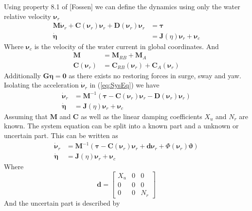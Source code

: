 \documentclass[12pt,a4]{article}
\begin{document}
Using property 8.1 of [Fossen] we can define the dynamics using only the water relative velocity $\bm{\nu}_r$
\begin{align}
	\label{eq:SysEq} \bm{M}\bm{\dot{\nu}}_r + \bm{C}(\bm{\nu}_r)\bm{\nu}_r +\bm{D}(\bm{\nu}_r)\bm{\nu}_r & = \bm{\tau}                           \\
	\bm{\dot{\eta}}                                                                                      & = \bm{J}(\eta)\bm{\nu}_r + \bm{\nu}_c
\end{align}
Where $\bm{\nu}_c$ is the velocity of the water current in global coordinates. And
\begin{align}
	\bm{M}             & = \bm{M}_{RB} + \bm{M}_{A}                         \\
	\bm{C}(\bm{\nu}_r) & = \bm{C}_{RB}(\bm{\nu}_r) + \bm{C}_{A}(\bm{\nu}_r)
\end{align}
Additionally $\bm{G}\bm{\eta} = \bm{0}$ as there exists no restoring forces in surge, sway and yaw.
Isolating the acceleration $\bm{\dot{\nu}}_r$ in (\ref{eq:SysEq}) we have
\begin{align}
	\bm{\dot{\nu}}_r & = \bm{M}^{-1} (\bm{\tau} -\bm{C}(\bm{\nu}_r)\bm{\nu}_r -\bm{D}(\bm{\nu}_r)\bm{\nu}_r ) \\
	\bm{\dot{\eta}}  & = \bm{J}(\eta)\bm{\nu}_r + \bm{\nu}_c
\end{align}
Assuming that $\bm{M}$ and $\bm{C}$ as well as the linear damping coefficients $X_u$ and $N_r$ are known. The system equation can be split into a known part and a unknown or uncertain part. This can be written as
\begin{align}
	\bm{\dot{\nu}}_r & = \bm{M}^{-1} (\bm{\tau} -\bm{C}(\bm{\nu}_r)\bm{\nu}_r + \bm{d} \bm{\nu}_r + \Phi(\bm{\nu}_r )\bm{\vartheta}) \\
	\bm{\dot{\eta}}  & = \bm{J}(\eta)\bm{\nu}_r + \bm{\nu}_c
\end{align}
Where
\begin{equation}
	\bm{d} = \begin{bmatrix}
		X_u & 0 & 0   \\
		0   & 0 & 0   \\
		0   & 0 & N_r
	\end{bmatrix}
\end{equation}
And the uncertain part is described by
\end{document}
